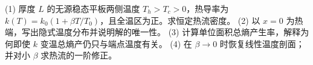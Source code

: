 (1) 厚度 \(L\) 的无源稳态平板两侧温度 \(T_h>T_c>0\)，热导率为 \(k(T)=k_0(1+\beta T/T_0)\)，且全温区为正。求恒定热流密度。
(2) 以 \(x=0\) 为热端，写出隐式温度分布并说明解的唯一性。
(3) 计算单位面积总熵产生率，解释为何即使 \(k\) 变温总熵产仍只与端点温度有关。
(4) 在 \(\beta\to0\) 时恢复线性温度剖面；并对小 \(\beta\) 求热流的一阶修正。
